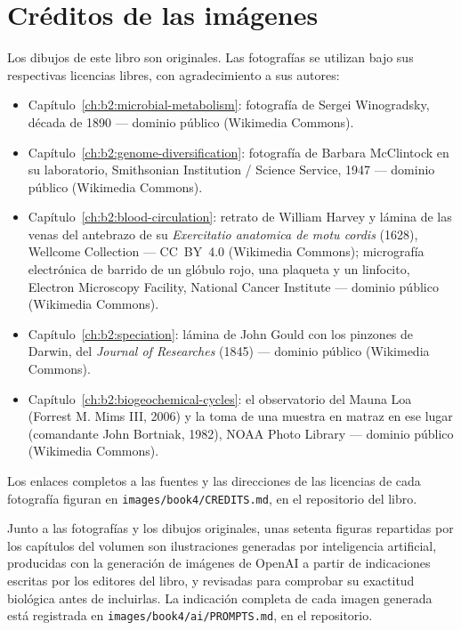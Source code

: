 \chapter*{Créditos de las imágenes}

\begingroup\sloppy

Los dibujos de este libro son originales. Las fotografías se utilizan
bajo sus respectivas licencias libres, con agradecimiento a sus
autores:

\begin{itemize}
  \item Capítulo~\ref{ch:b2:microbial-metabolism}: fotografía de Sergei
        Winogradsky, década de 1890 --- dominio público (Wikimedia Commons).
  \item Capítulo~\ref{ch:b2:genome-diversification}: fotografía de
        Barbara McClintock en su laboratorio, Smithsonian Institution /
        Science Service, 1947 --- dominio público (Wikimedia Commons).
  \item Capítulo~\ref{ch:b2:blood-circulation}: retrato de William
        Harvey y lámina de las venas del antebrazo de su
        \emph{Exercitatio anatomica de motu cordis} (1628), Wellcome
        Collection --- CC~BY~4.0 (Wikimedia Commons); micrografía
        electrónica de barrido de un glóbulo rojo, una plaqueta y un
        linfocito, Electron Microscopy Facility, National Cancer
        Institute --- dominio público (Wikimedia Commons).
  \item Capítulo~\ref{ch:b2:speciation}: lámina de John Gould con los
        pinzones de Darwin, del \emph{Journal of Researches} (1845) ---
        dominio público (Wikimedia Commons).
  \item Capítulo~\ref{ch:b2:biogeochemical-cycles}: el observatorio del
        Mauna Loa (Forrest M. Mims III, 2006) y la toma de una muestra en
        matraz en ese lugar (comandante John Bortniak, 1982), NOAA Photo
        Library --- dominio público (Wikimedia Commons).
\end{itemize}

Los enlaces completos a las fuentes y las direcciones de las licencias
de cada fotografía figuran en \texttt{images/\allowbreak book4/\allowbreak CREDITS.md},
en el repositorio del libro.

\bigskip
Junto a las fotografías y los dibujos originales, unas setenta
figuras repartidas por los capítulos del volumen son ilustraciones
generadas por inteligencia artificial, producidas con la generación de
imágenes de OpenAI a partir de indicaciones escritas por los editores
del libro, y revisadas para comprobar su exactitud biológica antes de
incluirlas. La indicación completa de cada imagen generada está
registrada en \texttt{images/\allowbreak book4/\allowbreak ai/\allowbreak PROMPTS.md}, en el repositorio.
\par\endgroup
\clearpage

